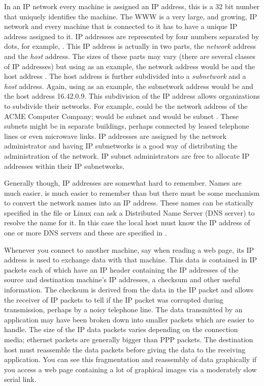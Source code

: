 In an IP network every machine is assigned an IP address,
this is a 32 bit number that uniquely identifies the machine.
The WWW is a very large, and growing, IP network and every machine that is connected to it has to have
a unique IP address assigned to it.
IP addresses are represented by four numbers separated by dots, for example, .
This IP address is actually in two parts, the {\em network} address and the {\em host} address.
The sizes of these parts may vary (there are several classes of IP addresses) 
but using  as an example, the network address would
be  and the host address .
The host address is further subdivided into a {\em subnetwork} and a {\em host} address.
Again, using  as an example, the subnetwork address would be  and the host
address {16.42.0.9}.
This subdivision of the IP address allows organizations to subdivide their networks.
For example,  could be the network address of the ACME Computer Company;  would
be subnet  and  would be subnet .
These subnets might be in separate buildings, perhaps connected by leased telephone lines or even
microwave links.
IP addresses are assigned by the network administrator and having IP subnetworks is a good way
of distributing the administration of the network.
IP subnet administrators are free to allocate IP addresses within their IP subnetworks.

Generally though, IP addresses are somewhat hard to remember.
Names are much easier.
 is much easier to remember than  but there must be some mechanism
to convert the network names into an IP address.
These names can be statically specified in the  file or Linux can ask a Distributed Name Server (DNS
server) to resolve the name for it.
In this case the local host must know the IP address of one or more DNS servers and these are specified
in .

Whenever you connect to another machine, say when reading a web page, its IP address is used to 
exchange data with that machine.
This data is contained in IP packets each of which have an IP header containing the 
IP addresses of the source and destination machine's IP addresses, a checksum and other useful information.
The checksum is derived from the data in the IP packet and allows the receiver of IP packets to tell if the
IP packet was corrupted during transmission, perhaps by a noisy telephone line.
The data transmitted by an application may have been broken down into smaller packets which are easier
to handle.
The size of the IP data packets varies depending on the connection media; ethernet packets are generally 
bigger than PPP packets.
The destination host must reassemble the data packets before giving the data to the receiving application.
You can see this fragmentation and reassembly of data graphically if you access a web page containing a lot of 
graphical images via a moderately slow serial link.

